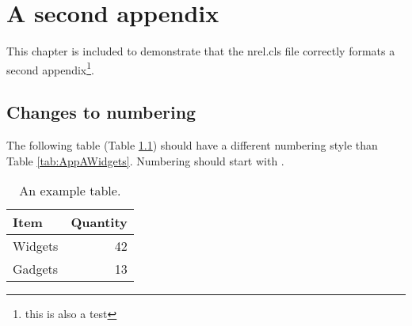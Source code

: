 \chapter{A second appendix}
This chapter is included to demonstrate that the nrel.cls file correctly formats a second appendix\footnote{this is also a test}.

\section{Changes to numbering}
The following table (Table \ref{tab:AppBWidgets}) should have a different numbering style than Table \ref{tab:AppAWidgets}. Numbering should start with \thechapter.

\begin{table}[!h]
\centering
\caption{An example table.}\label{tab:AppBWidgets}
\begin{tabular}{lr}
Item & Quantity \\
\hline
Widgets & 42 \\
Gadgets & 13
\end{tabular}
\end{table}

